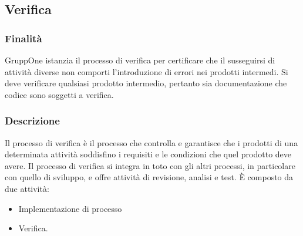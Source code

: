 \documentclass[../norme-di-progetto.tex]{subfiles}
\begin{document}
\subsection{Verifica}%
\label{sub:verifica}

\subsubsection{Finalità}%
\label{subs:verifica/finalita}

GruppOne istanzia il processo di verifica per certificare che il susseguirsi di attività diverse non comporti l'introduzione di errori nei prodotti intermedi.
Si deve verificare qualsiasi prodotto intermedio, pertanto sia documentazione che codice sono soggetti a verifica.

\subsubsection{Descrizione}%
\label{subs:verifica/descrizione}


Il processo di verifica è il processo che controlla e garantisce che i prodotti di una determinata attività soddisfino i requisiti e le condizioni che quel prodotto deve avere. Il processo di verifica si integra in toto con gli altri processi, in particolare con quello di sviluppo, e offre attività di revisione, analisi e test. È composto da due attività:

\begin{itemize}
  \item Implementazione di processo
  \item Verifica.
\end{itemize}
\end{document}
